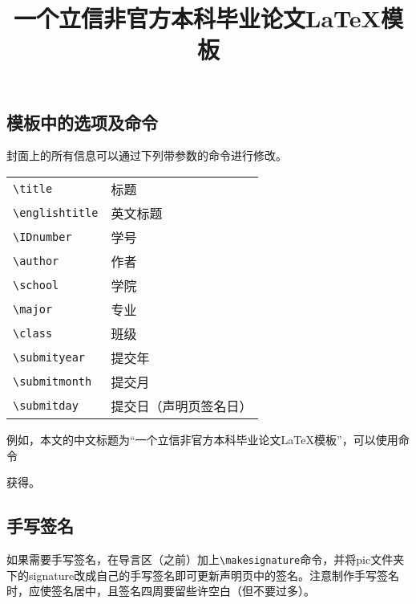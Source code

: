 \subsection{模板中的选项及命令}
封面上的所有信息可以通过下列带参数的命令进行修改。
\begin{mybox}
\begin{tabular}{p{10cm}p{5cm}}
	\verb|\title|         & 标题\\
	\verb|\englishtitle|  & 英文标题\\
	\verb|\IDnumber|      & 学号\\
	\verb|\author|        & 作者\\
	\verb|\school|        & 学院\\
	\verb|\major|         & 专业\\
	\verb|\class|         & 班级\\ 
	\verb|\submityear|    & 提交年\\
	\verb|\submitmonth|   & 提交月\\
    \verb|\submitday|     & 提交日（声明页签名日）\\
\end{tabular}
\end{mybox}
\noindent 例如，本文的中文标题为“一个立信非官方本科毕业论文\LaTeX 模板”，可以使用命令
\begin{listonly}{}
\title{一个立信非官方本科毕业论文\LaTeX 模板}
\end{listonly}
\noindent 获得。

\subsection{手写签名}
如果需要手写签名，在导言区（\verb||之前）加上\verb|\makesignature|命令，并将pic文件夹下的signature改成自己的手写签名即可更新声明页中的签名。注意制作手写签名时，应使签名居中，且签名四周要留些许空白（但不要过多）。


